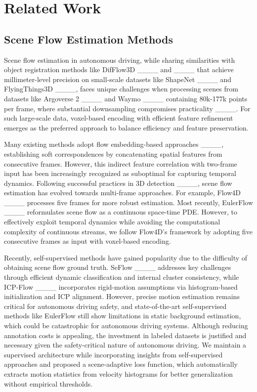 \section{Related Work}
\subsection{Scene Flow Estimation Methods}
Scene flow estimation in autonomous driving, while sharing similarities with object registration methods like DifFlow3D ____ and ____ that achieve millimeter-level precision on small-scale datasets like ShapeNet ____ and FlyingThings3D ____, faces unique challenges when processing scenes from datasets like Argoverse 2 ____ and Waymo ____ containing 80k-177k points per frame, where substantial downsampling compromises practicality ____. For such large-scale data, voxel-based encoding with efficient feature refinement emerges as the preferred approach to balance efficiency and feature preservation.

Many existing methods adopt flow embedding-based approaches ____, establishing soft correspondences by concatenating spatial features from consecutive frames. However, this indirect feature correlation with two-frame input has been increasingly recognized as suboptimal for capturing temporal dynamics. Following successful practices in 3D detection ____, scene flow estimation has evolved towards multi-frame approaches. For example, Flow4D ____ processes five frames for more robust estimation. Most recently, EulerFlow ____ reformulates scene flow as a continuous space-time PDE. However, to effectively exploit temporal dynamics while avoiding the computational complexity of continuous streams, we follow Flow4D's framework by adopting five consecutive frames as input with voxel-based encoding.

Recently, self-supervised methods have gained popularity due to the difficulty of obtaining scene flow ground truth. SeFlow ____ addresses key challenges through efficient dynamic classification and internal cluster consistency, while ICP-Flow ____ incorporates rigid-motion assumptions via histogram-based initialization and ICP alignment. However, precise motion estimation remains critical for autonomous driving safety, and state-of-the-art self-supervised methods like EulerFlow still show limitations in static background estimation, which could be catastrophic for autonomous driving systems. Although reducing annotation costs is appealing, the investment in labeled datasets is justified and necessary given the safety-critical nature of autonomous driving. We maintain a supervised architecture while incorporating insights from self-supervised approaches and proposed a scene-adaptive loss function, which automatically extracts motion statistics from velocity histograms for better generalization without empirical thresholds.

